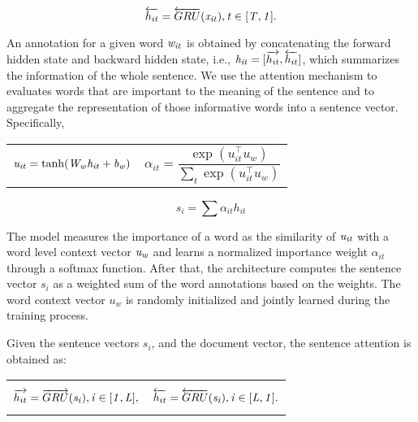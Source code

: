 \documentclass[runningheads]{llncs}
\begin{document}
\vspace{-5mm}

\begin{equation}
    \overleftarrow{h_{it}} = \overleftarrow{GRU}(\it{x_{it}}), t \in [T,1].
\end{equation}

An annotation for a given word $\it{w_{it}}$ is obtained by concatenating the forward hidden state and backward hidden state, i.e., $\it{h_{it}} = [\overrightarrow{h_{it}}, \overleftarrow{h_{it}}]$, which summarizes the information of the whole sentence. We use the attention mechanism to evaluates words that are important to the meaning of the sentence and to aggregate the representation of those informative words into a sentence vector. Specifically,\\[-6mm]



\noindent
\begin{tabularx}{\linewidth}{@{}XX@{}}
    \begin{equation}
      \it{u_{it}} = \tanh(\it{W_wh_{it}} + \it{b_w})
    \end{equation}
    &
    \begin{equation}
      \alpha_{it} = \dfrac{\exp(u_{it}^ \top u_w)}{\sum_t \exp(u_{it}^ \top u_w)}
    \end{equation}
\end{tabularx}

\vspace{-5mm}

\begin{equation}
    s_i = \sum \alpha_{it} h_{it}
\end{equation}

\vspace{-2mm}

The model measures the importance of a word as the similarity of $\it{u_{it}}$ with a word level context vector $\it{u_w}$ and learns a normalized importance weight $\alpha_{it}$ through a softmax function. After that, the architecture computes the sentence vector $s_i$  as a weighted sum of the word annotations based on the weights. The word context vector $u_w$ is randomly initialized and jointly learned during the training process.

Given the sentence vectors $s_i$, and the document vector, the sentence attention is obtained as:\\[-6mm]




\noindent
\begin{tabularx}{\linewidth}{XX}
    \begin{equation}
      \overrightarrow{h_{it}} = \overrightarrow{GRU}(\it{s_{i}}), i \in [1,L],
    \end{equation}
    &
    \begin{equation}
      \overleftarrow{h_{it}} = \overleftarrow{GRU}(\it{s_{i}}), i \in [L,1].
    \end{equation}
    
\end{tabularx}
\end{document}
